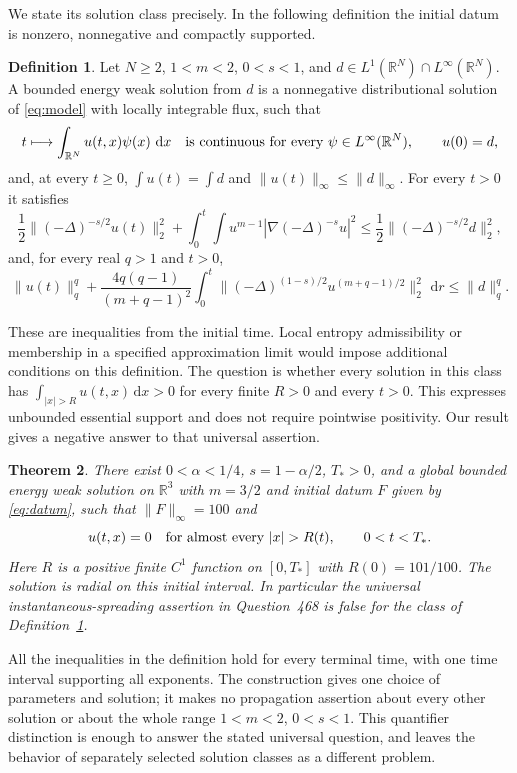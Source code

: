 \documentclass[11pt]{article}
\newcommand{\R}{\mathbb R}
\newcommand{\dd}{\,\mathrm d}
\newtheorem{theorem}{Theorem}[section]
\theoremstyle{definition}
\newtheorem{definition}[theorem]{Definition}
\numberwithin{equation}{section}
\begin{document}
We state its solution class precisely. In the following definition the
initial datum is nonzero, nonnegative and compactly supported.

\begin{definition}\label{def:class}
Let $N\geq2$, $1<m<2$, $0<s<1$, and
$d\in L^1(\R^N)\cap L^\infty(\R^N)$.
A bounded energy weak solution from $d$ is a nonnegative distributional
solution of \eqref{eq:model} with locally integrable flux, such that
\[
 t\longmapsto\int_{\R^N}u(t,x)\psi(x)\,\dd x
 \quad\hbox{is continuous for every }\psi\in L^\infty(\R^N),
 \qquad u(0)=d,
\]
and, at every $t\geq0$, $\int u(t)=\int d$ and
$\|u(t)\|_\infty\leq\|d\|_\infty$. For every $t>0$ it satisfies
\begin{equation}\label{eq:class-pressure}
 \frac12\|(-\Delta)^{-s/2}u(t)\|_2^2+
 \int_0^t\int u^{m-1}|\nabla(-\Delta)^{-s}u|^2
 \leq\frac12\|(-\Delta)^{-s/2}d\|_2^2,
\end{equation}
and, for every real $q>1$ and $t>0$,
\begin{equation}\label{eq:class-power}
 \|u(t)\|_q^q+\frac{4q(q-1)}{(m+q-1)^2}
 \int_0^t\|(-\Delta)^{(1-s)/2}u^{(m+q-1)/2}\|_2^2\,\dd r
 \leq\|d\|_q^q.
\end{equation}
\end{definition}

These are inequalities from the initial time. Local entropy admissibility
or membership in a specified approximation limit would impose additional
conditions on this definition. The question is whether every solution in
this class has
$\int_{|x|>R}u(t,x)\dd x>0$ for every finite $R>0$ and every $t>0$.
This expresses unbounded essential support and does not require pointwise
positivity. Our result gives a negative answer to that universal assertion.

\begin{theorem}\label{thm:main}
There exist $0<\alpha<1/4$, $s=1-\alpha/2$, $T_*>0$, and a global
bounded energy weak solution on $\R^3$ with $m=3/2$ and initial datum
$F$ given by \eqref{eq:datum}, such that $\|F\|_\infty=100$ and
\[
 u(t,x)=0\quad\hbox{for almost every }|x|>R(t),
 \qquad 0<t<T_*.
\]
Here $R$ is a positive finite $C^1$ function on $[0,T_*]$ with
$R(0)=101/100$. The solution is radial on this initial interval.
In particular the universal instantaneous-spreading assertion in
Question~468 is false for the class of Definition~\ref{def:class}.
\end{theorem}

All the inequalities in the definition hold for every terminal time, with
one time interval supporting all exponents. The construction gives one
choice of parameters and solution; it makes no propagation assertion
about every other solution or about the whole range $1<m<2$, $0<s<1$.
This quantifier distinction is enough to answer the stated universal
question, and leaves the behavior of separately selected solution classes
as a different problem.
\end{document}
